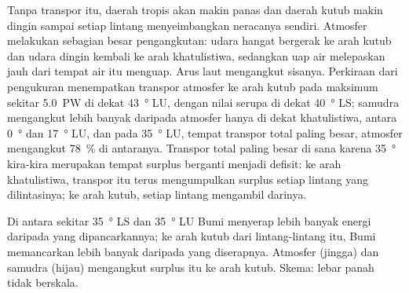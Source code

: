 Tanpa transpor itu, daerah tropis akan makin panas dan daerah kutub makin
dingin sampai setiap lintang menyeimbangkan neracanya sendiri. Atmosfer
melakukan sebagian besar pengangkutan: udara hangat bergerak ke arah kutub dan
udara dingin kembali ke arah khatulistiwa, sedangkan uap air melepaskan  jauh dari tempat air itu menguap. Arus laut mengangkut sisanya.
Perkiraan dari pengukuran menempatkan transpor atmosfer ke arah kutub pada
maksimum sekitar \qty{5.0}{PW} di dekat \qty{43}{\degree} LU, dengan nilai
serupa di dekat \qty{40}{\degree} LS; samudra mengangkut lebih banyak daripada
atmosfer hanya di dekat khatulistiwa, antara \qty{0}{\degree} dan
\qty{17}{\degree} LU, dan pada \qty{35}{\degree} LU, tempat transpor total
paling besar, atmosfer mengangkut \qty{78}{\percent} di antaranya. Transpor
total paling besar di sana karena \qty{35}{\degree} kira-kira merupakan tempat
surplus berganti menjadi defisit: ke arah khatulistiwa, transpor itu terus
mengumpulkan surplus setiap lintang yang dilintasinya; ke arah kutub, setiap
lintang mengambil darinya.

\begin{omfigure}

{\small Di antara sekitar \qty{35}{\degree} LS dan \qty{35}{\degree} LU Bumi
menyerap lebih banyak energi daripada yang dipancarkannya; ke arah kutub dari
lintang-lintang itu, Bumi memancarkan lebih banyak daripada yang diserapnya.
Atmosfer (jingga) dan samudra (hijau) mengangkut surplus itu ke arah kutub.
Skema: lebar panah tidak berskala.}
\end{omfigure}

